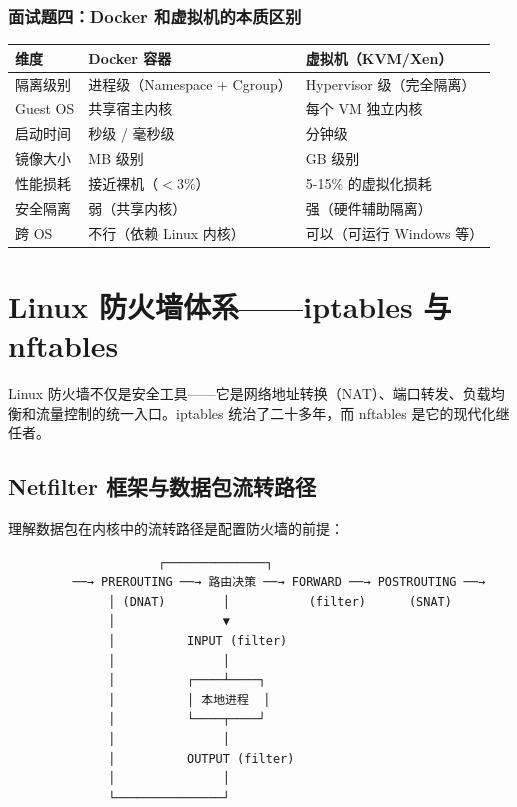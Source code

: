 \documentclass[12pt,UTF8]{ctexbook}
\begin{document}
\subsection*{面试题四：Docker 和虚拟机的本质区别}

\begin{tabular}{|p{3cm}|p{3.5cm}|p{3.5cm}|}
\hline
\textbf{维度} & \textbf{Docker 容器} & \textbf{虚拟机（KVM/Xen）} \\
\hline
隔离级别 & 进程级（Namespace + Cgroup） & Hypervisor 级（完全隔离） \\
\hline
Guest OS & 共享宿主内核 & 每个 VM 独立内核 \\
\hline
启动时间 & 秒级 / 毫秒级 & 分钟级 \\
\hline
镜像大小 & MB 级别 & GB 级别 \\
\hline
性能损耗 & 接近裸机（$<$3\%） & 5-15\% 的虚拟化损耗 \\
\hline
安全隔离 & 弱（共享内核） & 强（硬件辅助隔离） \\
\hline
跨 OS & 不行（依赖 Linux 内核） & 可以（可运行 Windows 等） \\
\hline
\end{tabular}

\chapter{Linux 防火墙体系——iptables 与 nftables}
\label{chap:firewall}

Linux 防火墙不仅是安全工具——它是网络地址转换（NAT）、端口转发、负载均衡和流量控制的统一入口。iptables 统治了二十多年，而 nftables 是它的现代化继任者。

\section{Netfilter 框架与数据包流转路径}

理解数据包在内核中的流转路径是配置防火墙的前提：

\begin{lstlisting}
                     ┌──────────────┐
         ──→ PREROUTING ──→ 路由决策 ──→ FORWARD ──→ POSTROUTING ──→
              │ (DNAT)        │           (filter)      (SNAT)
              │               ▼
              │          INPUT (filter)
              │               │
              │          ┌────┴────┐
              │          │ 本地进程  │
              │          └────┬────┘
              │               │
              │          OUTPUT (filter)
              │               │
              └───────────────┘
\end{lstlisting}
\end{document}
